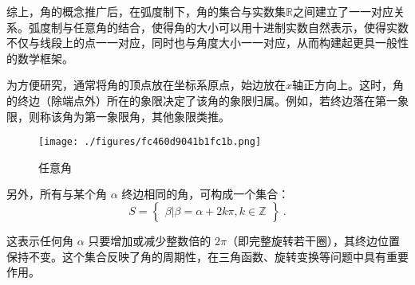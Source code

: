 综上，角的概念推广后，在弧度制下，角的集合与实数集$\mathbb{R}$之间建立了一一对应关系。弧度制与任意角的结合，使得角的大小可以用十进制实数自然表示，使得实数不仅与线段上的点一一对应，同时也与角度大小一一对应，从而构建起更具一般性的数学框架。

为方便研究，通常将角的顶点放在坐标系原点，始边放在$x$轴正方向上。这时，角的终边（除端点外）所在的象限决定了该角的象限归属。例如，若终边落在第一象限，则称该角为第一象限角，其他象限类推。
\begin{figure}[ht]
\centering
\texttt{[image: ./figures/fc460d9041b1fc1b.png]}
\caption{任意角} \label{fig_HsTrFu_5}
\end{figure}

另外，所有与某个角 $\alpha$ 终边相同的角，可构成一个集合：
\begin{equation}
S = \begin{Bmatrix} \beta|\beta=\alpha+2k\pi,k \in \mathbb{Z} \end{Bmatrix}~.
\end{equation}

这表示任何角 $\alpha$ 只要增加或减少整数倍的 $2\pi$（即完整旋转若干圈），其终边位置保持不变。这个集合反映了角的周期性，在三角函数、旋转变换等问题中具有重要作用。

